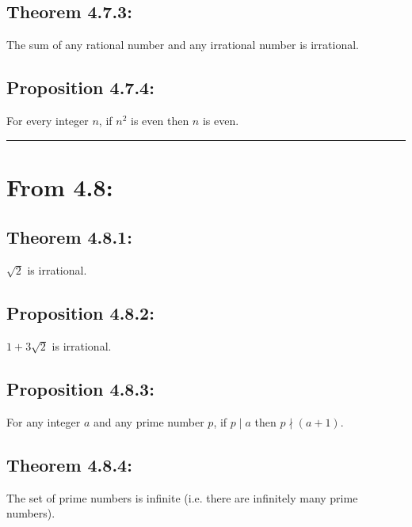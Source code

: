 \documentclass[11pt]{article}
\begin{document}
\subsection*{Theorem 4.7.3:}
The sum of any rational number and any irrational number is irrational. 

\subsection*{Proposition 4.7.4:}
For every integer $n$, if $n^2$ is even then $n$ is even. 

\bigskip
\hrule
\bigskip

\section*{From 4.8:}

\subsection*{Theorem 4.8.1:}
$\sqrt{2}$ is irrational. 

\subsection*{Proposition 4.8.2:}
$1 + 3 \sqrt{2}$ is irrational. 

\subsection*{Proposition 4.8.3:}
For any integer $a$ and any prime number $p$, if $p \mid a$
then $p \nmid (a + 1)$. 

\subsection*{Theorem 4.8.4:}
The set of prime numbers is infinite (i.e. there are 
infinitely many prime numbers).

\newpage
\end{document}
